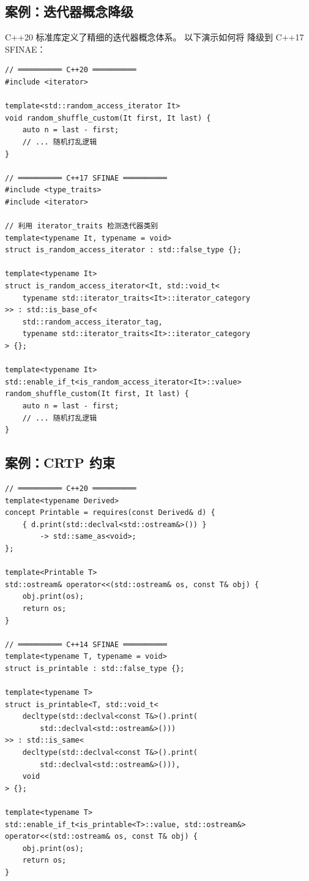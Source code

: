 \documentclass[12pt,a4paper,fontset=fandol]{ctexbook}
\begin{document}
\subsection{案例：迭代器概念降级}

C++20 标准库定义了精细的迭代器概念体系。
以下演示如何将 \texttt{} 降级到 C++17 SFINAE：

\begin{lstlisting}
// ══════════ C++20 ══════════
#include <iterator>

template<std::random_access_iterator It>
void random_shuffle_custom(It first, It last) {
    auto n = last - first;
    // ... 随机打乱逻辑
}

// ══════════ C++17 SFINAE ══════════
#include <type_traits>
#include <iterator>

// 利用 iterator_traits 检测迭代器类别
template<typename It, typename = void>
struct is_random_access_iterator : std::false_type {};

template<typename It>
struct is_random_access_iterator<It, std::void_t<
    typename std::iterator_traits<It>::iterator_category
>> : std::is_base_of<
    std::random_access_iterator_tag,
    typename std::iterator_traits<It>::iterator_category
> {};

template<typename It>
std::enable_if_t<is_random_access_iterator<It>::value>
random_shuffle_custom(It first, It last) {
    auto n = last - first;
    // ... 随机打乱逻辑
}
\end{lstlisting}

\subsection{案例：CRTP 约束}

\begin{lstlisting}
// ══════════ C++20 ══════════
template<typename Derived>
concept Printable = requires(const Derived& d) {
    { d.print(std::declval<std::ostream&>()) }
        -> std::same_as<void>;
};

template<Printable T>
std::ostream& operator<<(std::ostream& os, const T& obj) {
    obj.print(os);
    return os;
}

// ══════════ C++14 SFINAE ══════════
template<typename T, typename = void>
struct is_printable : std::false_type {};

template<typename T>
struct is_printable<T, std::void_t<
    decltype(std::declval<const T&>().print(
        std::declval<std::ostream&>()))
>> : std::is_same<
    decltype(std::declval<const T&>().print(
        std::declval<std::ostream&>())),
    void
> {};

template<typename T>
std::enable_if_t<is_printable<T>::value, std::ostream&>
operator<<(std::ostream& os, const T& obj) {
    obj.print(os);
    return os;
}
\end{lstlisting}
\end{document}
